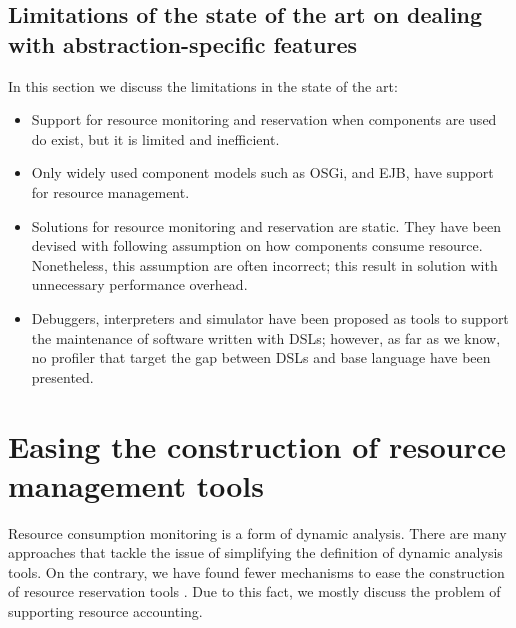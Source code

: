 \subsection{Limitations of the state of the art on dealing with abstraction-specific features}


In this section we discuss the limitations in the state of the art:

\begin{itemize}
\item Support for resource monitoring and reservation when components are used do exist, but it is limited and inefficient.

\item Only widely used component models such as OSGi, and EJB, have support for resource management.

\item Solutions for resource monitoring and reservation are static.
They have been devised with following assumption on how components consume resource.
Nonetheless, this assumption are often incorrect; this result in solution with unnecessary performance overhead.

\item Debuggers, interpreters and simulator have been proposed as tools to support the maintenance of software written with DSLs; however, as far as we know, no profiler that target the gap between DSLs and base language have been presented.

\end{itemize}


\section{Easing the construction of resource management tools}

Resource consumption monitoring is a form of dynamic analysis.
There are many approaches that tackle the issue of simplifying the definition of dynamic analysis tools.
On the contrary, we have found fewer mechanisms to ease the construction of resource reservation tools \cite{mueller}.
Due to this fact, we mostly discuss the problem of supporting resource accounting. 


